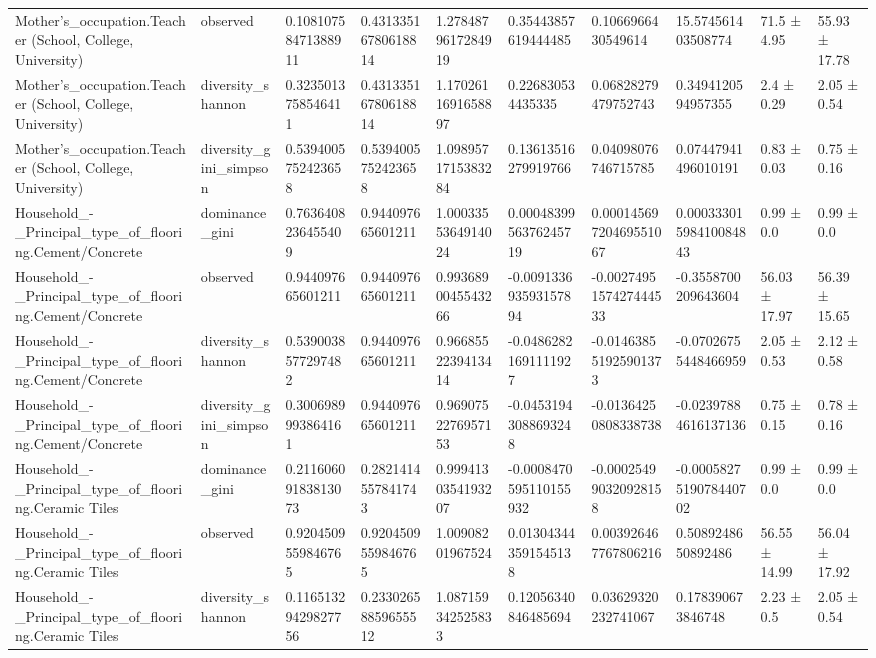 \begin{longtable}{llllllllll}
Mother’s\_occupation.Teacher (School, College, University) & observed & 0.10810758471388911 & 0.43133516780618814 & 1.2784879617284919 & 0.35443857619444485 & 0.1066966430549614 & 15.574561403508774 & 71.5 ± 4.95 & 55.93 ± 17.78 \\
Mother’s\_occupation.Teacher (School, College, University) & diversity\_shannon & 0.3235013758546411 & 0.43133516780618814 & 1.1702611691658897 & 0.226830534435335 & 0.06828279479752743 & 0.3494120594957355 & 2.4 ± 0.29 & 2.05 ± 0.54 \\
Mother’s\_occupation.Teacher (School, College, University) & diversity\_gini\_simpson & 0.5394005752423658 & 0.5394005752423658 & 1.0989571715383284 & 0.13613516279919766 & 0.04098076746715785 & 0.07447941496010191 & 0.83 ± 0.03 & 0.75 ± 0.16 \\
Household\_-\_Principal\_type\_of\_flooring.Cement/Concrete & dominance\_gini & 0.7636408236455409 & 0.944097665601211 & 1.0003355364914024 & 0.0004839956376245719 & 0.00014569720469551067 & 0.00033301598410084843 & 0.99 ± 0.0 & 0.99 ± 0.0 \\
Household\_-\_Principal\_type\_of\_flooring.Cement/Concrete & observed & 0.944097665601211 & 0.944097665601211 & 0.9936890045543266 & -0.009133693593157894 & -0.0027495157427444533 & -0.3558700209643604 & 56.03 ± 17.97 & 56.39 ± 15.65 \\
Household\_-\_Principal\_type\_of\_flooring.Cement/Concrete & diversity\_shannon & 0.5390038577297482 & 0.944097665601211 & 0.9668552239413414 & -0.04862821691111927 & -0.014638551925901373 & -0.07026755448466959 & 2.05 ± 0.53 & 2.12 ± 0.58 \\
Household\_-\_Principal\_type\_of\_flooring.Cement/Concrete & diversity\_gini\_simpson & 0.3006989993864161 & 0.944097665601211 & 0.9690752276957153 & -0.04531943088693248 & -0.01364250808338738 & -0.02397884616137136 & 0.75 ± 0.15 & 0.78 ± 0.16 \\
Household\_-\_Principal\_type\_of\_flooring.Ceramic Tiles & dominance\_gini & 0.21160609183813073 & 0.2821414557841743 & 0.9994130354193207 & -0.0008470595110155932 & -0.000254990320928158 & -0.0005827519078440702 & 0.99 ± 0.0 & 0.99 ± 0.0 \\
Household\_-\_Principal\_type\_of\_flooring.Ceramic Tiles & observed & 0.9204509559846765 & 0.9204509559846765 & 1.00908201967524 & 0.013043443591545138 & 0.003926467767806216 & 0.5089248650892486 & 56.55 ± 14.99 & 56.04 ± 17.92 \\
Household\_-\_Principal\_type\_of\_flooring.Ceramic Tiles & diversity\_shannon & 0.11651329429827756 & 0.23302658859655512 & 1.087159342525833 & 0.12056340846485694 & 0.03629320232741067 & 0.178390673846748 & 2.23 ± 0.5 & 2.05 ± 0.54 \\

\end{longtable}
